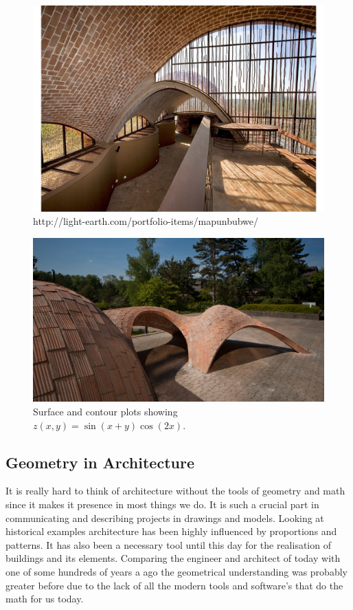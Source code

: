 \begin{figure}[H]
\centering
\includegraphics[width=0.9\linewidth ]{figure/Introduction/Vault_Contemporary.pdf}
\caption{http://light-earth.com/portfolio-items/mapunbubwe/}
\end{figure}


\begin{figure}[H]
\centering
\includegraphics[width=0.9\linewidth ]{figure/Introduction/Block_Vault.jpg}
\caption{Surface and contour plots showing $z(x,y)=\sin(x+y)\cos(2x)$.}
\end{figure}

\subsection{Geometry in Architecture}

It is really hard to think of architecture without the tools of geometry and math since it makes it presence in most things we do. It is such a crucial part in communicating and describing projects in drawings and models. Looking at historical examples architecture has been highly influenced
by proportions and patterns. It has also been a necessary tool until this day for the realisation of buildings and its elements. Comparing the engineer and architect of today with one of some hundreds of years a ago the geometrical  understanding was probably greater before due to the lack of  all the modern tools and software's that do the math for us today.  



